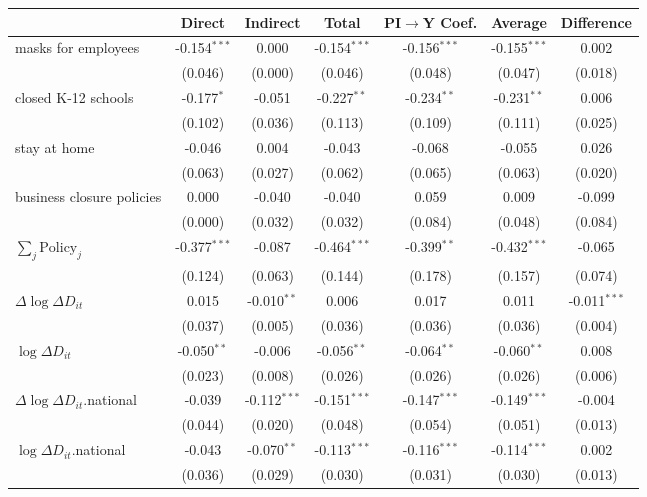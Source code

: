 
\begin{tabular}{lccccc|>{}c}
\toprule
  & Direct & Indirect & Total & PI$\to$Y Coef. & Average & Difference\\
\midrule
masks for employees & -0.154$^{***}$ & 0.000 & -0.154$^{***}$ & -0.156$^{***}$ & -0.155$^{***}$ & 0.002\\
 & (0.046) & (0.000) & (0.046) & (0.048) & (0.047) & (0.018)\\
closed K-12 schools & -0.177$^{*}$ & -0.051 & -0.227$^{**}$ & -0.234$^{**}$ & -0.231$^{**}$ & 0.006\\
 & (0.102) & (0.036) & (0.113) & (0.109) & (0.111) & (0.025)\\
stay at home & -0.046 & 0.004 & -0.043 & -0.068 & -0.055 & 0.026\\
 & (0.063) & (0.027) & (0.062) & (0.065) & (0.063) & (0.020)\\
business closure policies & 0.000 & -0.040 & -0.040 & 0.059 & 0.009 & -0.099\\
 & (0.000) & (0.032) & (0.032) & (0.084) & (0.048) & (0.084)\\
$\sum_j \mathrm{Policy}_j$ & -0.377$^{***}$ & -0.087 & -0.464$^{***}$ & -0.399$^{**}$ & -0.432$^{***}$ & -0.065\\
 & (0.124) & (0.063) & (0.144) & (0.178) & (0.157) & (0.074)\\
$\Delta \log \Delta D_{it}$ & 0.015 & -0.010$^{**}$ & 0.006 & 0.017 & 0.011 & -0.011$^{***}$\\
 & (0.037) & (0.005) & (0.036) & (0.036) & (0.036) & (0.004)\\
$\log \Delta D_{it}$ & -0.050$^{**}$ & -0.006 & -0.056$^{**}$ & -0.064$^{**}$ & -0.060$^{**}$ & 0.008\\
 & (0.023) & (0.008) & (0.026) & (0.026) & (0.026) & (0.006)\\
$\Delta \log \Delta D_{it}$.national & -0.039 & -0.112$^{***}$ & -0.151$^{***}$ & -0.147$^{***}$ & -0.149$^{***}$ & -0.004\\
 & (0.044) & (0.020) & (0.048) & (0.054) & (0.051) & (0.013)\\
$\log \Delta D_{it}$.national & -0.043 & -0.070$^{**}$ & -0.113$^{***}$ & -0.116$^{***}$ & -0.114$^{***}$ & 0.002\\
 & (0.036) & (0.029) & (0.030) & (0.031) & (0.030) & (0.013)\\
\bottomrule
\end{tabular}